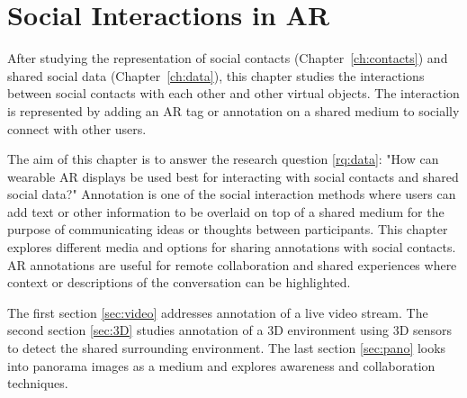 \chapter{Social Interactions in AR}
\label{ch:annotation}

After studying the representation of social contacts (Chapter~\ref{ch:contacts}) and shared social data (Chapter~\ref{ch:data}), this chapter studies the interactions between social contacts with each other and other virtual objects. The interaction is represented by adding an AR tag or annotation on a shared medium to socially connect with other users.

The aim of this chapter is to answer the research question \ref{rq:data}: "How can wearable AR displays be used best for interacting with social contacts and shared social data?"
Annotation is one of the social interaction methods where users can add text or other information to be overlaid on top of a shared medium for the purpose of communicating ideas or thoughts between participants. This chapter explores different media and options for sharing annotations with social contacts. AR annotations are useful for remote collaboration and shared experiences where context or descriptions of the conversation can be highlighted.

The first section \ref{sec:video} addresses annotation of a live video stream. The second section \ref{sec:3D} studies annotation of a 3D environment using 3D sensors to detect the shared surrounding environment. The last section \ref{sec:pano} looks into panorama images as a medium and explores awareness and collaboration techniques. 





